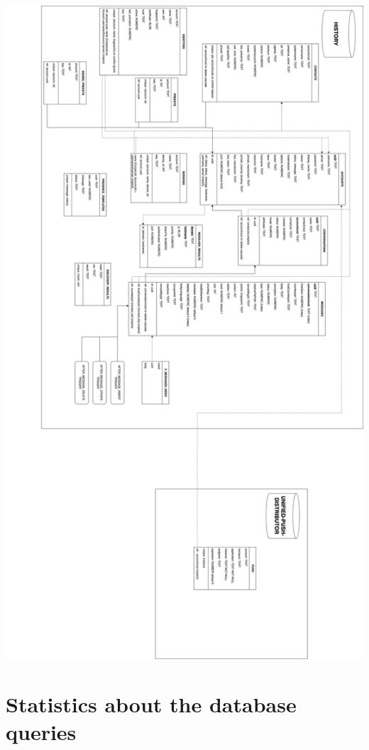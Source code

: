 \documentclass[a4paper,11pt]{article}
\begin{document}
\begin{center}
\includegraphics[scale=0.25]{Scema_Physique-Physique.jpg}
\end{center}

\section*{Statistics about the database queries}
\end{document}
